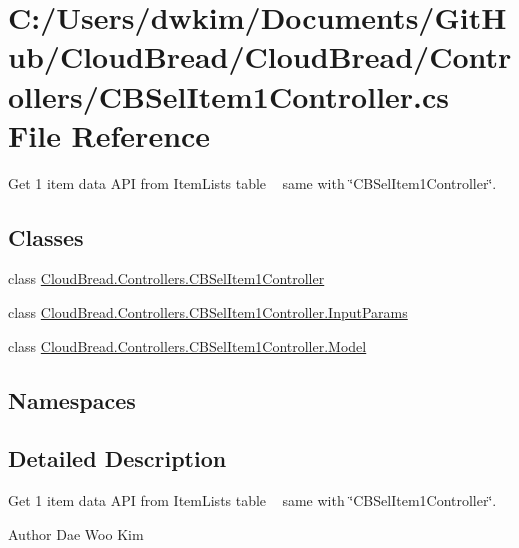 \hypertarget{a00219}{}\section{C\+:/\+Users/dwkim/\+Documents/\+Git\+Hub/\+Cloud\+Bread/\+Cloud\+Bread/\+Controllers/\+C\+B\+Sel\+Item1\+Controller.cs File Reference}
\label{a00219}


Get 1 item data A\+PI from Item\+Lists table ~\newline
same with \char`\"{}\+C\+B\+Sel\+Item1\+Controller\char`\"{}.  


\subsection*{Classes}
\begin{DoxyCompactItemize}
\item 
class \hyperlink{a00048}{Cloud\+Bread.\+Controllers.\+C\+B\+Sel\+Item1\+Controller}
\item 
class \hyperlink{a00125}{Cloud\+Bread.\+Controllers.\+C\+B\+Sel\+Item1\+Controller.\+Input\+Params}
\item 
class \hyperlink{a00157}{Cloud\+Bread.\+Controllers.\+C\+B\+Sel\+Item1\+Controller.\+Model}
\end{DoxyCompactItemize}
\subsection*{Namespaces}
\begin{DoxyCompactItemize}
\end{DoxyCompactItemize}


\subsection{Detailed Description}
Get 1 item data A\+PI from Item\+Lists table ~\newline
same with \char`\"{}\+C\+B\+Sel\+Item1\+Controller\char`\"{}. 

\begin{DoxyAuthor}{Author}
Dae Woo Kim 
\end{DoxyAuthor}

